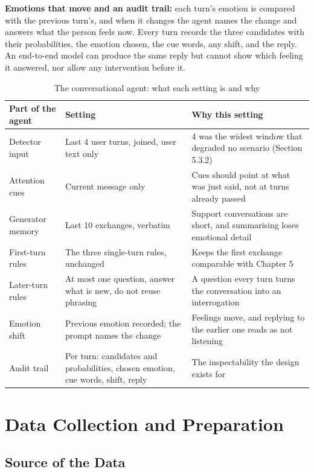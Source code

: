 \textbf{Emotions that move and an audit trail: }each turn's emotion is compared with the previous turn's, and when it changes the agent names the change and answers what the person feels now. Every turn records the three candidates with their probabilities, the emotion chosen, the cue words, any shift, and the reply. An end-to-end model can produce the same reply but cannot show which feeling it answered, nor allow any intervention before it.

\begin{table}[htbp]
\centering
\footnotesize
\begin{tabularx}{\textwidth}{@{}lXX@{}}
\toprule
\textbf{Part of the agent} & \textbf{Setting} & \textbf{Why this setting} \\
\midrule
Detector input & Last 4 user turns, joined, user text only & 4 was the widest window that degraded no scenario (Section 5.3.2) \\
Attention cues & Current message only & Cues should point at what was just said, not at turns already passed \\
Generator memory & Last 10 exchanges, verbatim & Support conversations are short, and summarising loses emotional detail \\
First-turn rules & The three single-turn rules, unchanged & Keeps the first exchange comparable with Chapter 5 \\
Later-turn rules & At most one question, answer what is new, do not reuse phrasing & A question every turn turns the conversation into an interrogation \\
Emotion shift & Previous emotion recorded; the prompt names the change & Feelings move, and replying to the earlier one reads as not listening \\
Audit trail & Per turn: candidates and probabilities, chosen emotion, cue words, shift, reply & The inspectability the design exists for \\
\bottomrule
\end{tabularx}
\caption{The conversational agent: what each setting is and why}
\label{tab:4.6}
\end{table}

\section{Data Collection and Preparation}
\label{sec:4.3}

\subsection{Source of the Data}

